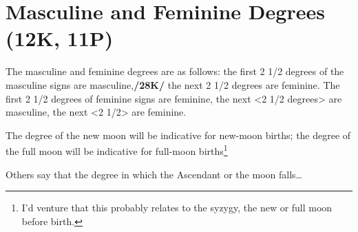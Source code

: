 \section{Masculine and Feminine Degrees (12K, 11P)}
The masculine and feminine degrees are as follows: the first 2 1/2 degrees of the masculine signs are masculine,\textbf{/28K/} the next 2 1/2 degrees are feminine. The first 2 1/2 degrees of feminine signs are feminine, the next <2 1/2 degrees> are masculine, the next <2 1/2> are feminine. 

\mndl[0.2cm]
The degree of the new moon will be indicative for new-moon births; the degree of the full moon will be indicative for full-moon births\footnote{I'd venture that this probably relates to the syzygy, the new or full moon before birth.} 

Others say that the degree in which the Ascendant or the moon falls\ldots

\newpage